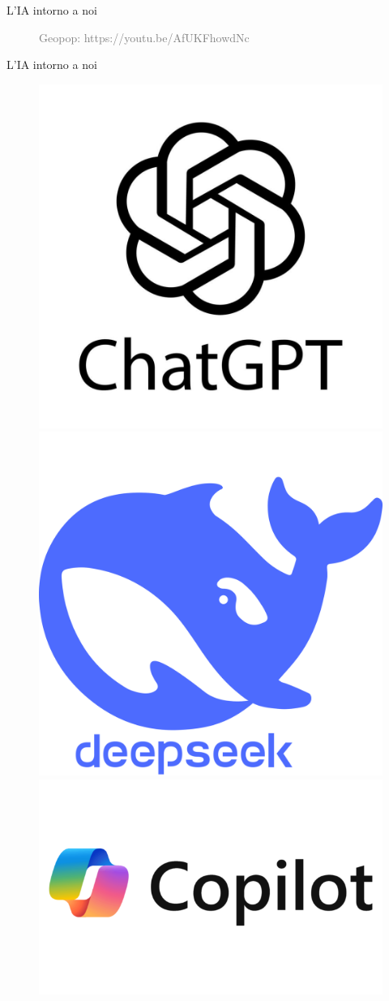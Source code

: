 \documentclass{beamer}
\begin{document}
\begin{frame}{L'IA intorno a noi}
    \begin{figure}
        \centering
        \caption*{\textcolor{gray}{Geopop: https://youtu.be/AfUKFhowdNc}}
    \end{figure}
\end{frame}

\begin{frame}{L'IA intorno a noi}
    \begin{figure}
        \centering
        \includegraphics[width=.4\linewidth]{imgs/llms_logo/chatgpt_logo.jpg}
        \includegraphics[width=.4\linewidth]{imgs/llms_logo/deepseek_logo.png}
        \includegraphics[width=.4\linewidth]{imgs/llms_logo/copilot_logo.png}
    \end{figure}
\end{frame}
\end{document}
